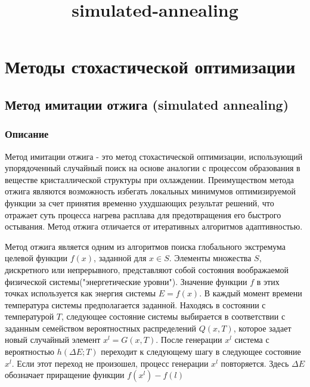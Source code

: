 \documentclass{article}
\title{simulated-annealing}
\begin{document}
    
    
    
    
    

    
    \section{Методы стохастической
оптимизации}\label{ux43cux435ux442ux43eux434ux44b-ux441ux442ux43eux445ux430ux441ux442ux438ux447ux435ux441ux43aux43eux439-ux43eux43fux442ux438ux43cux438ux437ux430ux446ux438ux438}

    \subsection{Метод имитации отжига (simulated
annealing)}\label{ux43cux435ux442ux43eux434-ux438ux43cux438ux442ux430ux446ux438ux438-ux43eux442ux436ux438ux433ux430-simulated-annealing}

    \subsubsection{Описание}\label{ux43eux43fux438ux441ux430ux43dux438ux435}

    Метод имитации отжига - это метод стохастической оптимизации,
использующий упорядоченный случайный поиск на основе аналогии с
процессом образования в веществе кристаллической структуры при
охлаждении. Преимуществом метода отжига являются возможность избегать
локальных минимумов оптимизируемой функции за счет принятия временно
ухудшающих результат решений, что отражает суть процесса нагрева
расплава для предотвращения его быстрого остывания. Метод отжига
отличается от итеративных алгоритмов адаптивностью.

    Метод отжига является одним из алгоритмов поиска глобального экстремума
целевой функции \(f(x)\), заданной для \(x \in S\). Элементы множества
\(S\), дискретного или непрерывного, представляют собой состояния
воображаемой физической системы("энергетические уровни"). Значение
функции \(f\) в этих точках используется как энергия системы
\(E = f(x)\). В каждый момент времени температура системы предполагается
заданной. Находясь в состоянии с температурой \(T\), следующее состояние
системы выбирается в соответствии с заданным семейством вероятностных
распределений \(Q(x, T)\), которое задает новый случайный элемент
\(x^l = G(x, T)\). После генерации \(x^l\) система с вероятностью
\(h(\Delta E; T)\) переходит к следующему шагу в следующее состояние
\(x^l\). Если этот переход не произошел, процесс генерации \(x^l\)
повторяется. Здесь \(\Delta E\) обозначает приращение функции
\(f(x^l) - f(l)\)
\end{document}
